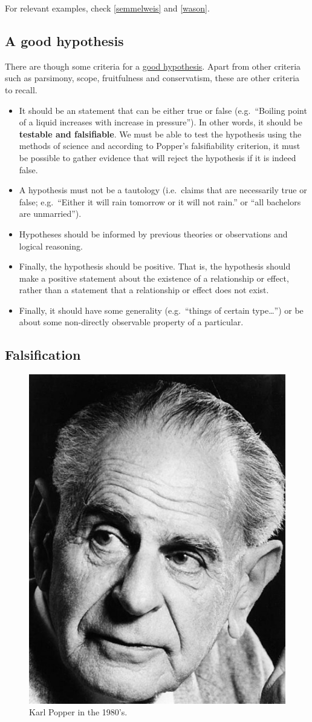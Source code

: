\documentclass[
]{book}
\begin{document}
For relevant examples, check \ref{semmelweis} and \ref{wason}.

\hypertarget{a-good-hypothesis}{%
\subsection{A good hypothesis}\label{a-good-hypothesis}}

There are though some criteria for a \href{https://opentext.wsu.edu/carriecuttler/chapter/developing-a-hypothesis/}{good hypothesis}. Apart from other criteria such as parsimony, scope, fruitfulness and conservatism, these are other criteria to recall.

\begin{itemize}
\item
  It should be an statement that can be either true or false (e.g.~``Boiling point of a liquid increases with increase in pressure''). In other words, it should be \textbf{testable and falsifiable}. We must be able to test the hypothesis using the methods of science and according to Popper's falsifiability criterion, it must be possible to gather evidence that will reject the hypothesis if it is indeed false.
\item
  A hypothesis must not be a tautology (i.e.~claims that are necessarily true or false; e.g.~``Either it will rain tomorrow or it will not rain.'' or ``all bachelors are unmarried'').
\item
  Hypotheses should be informed by previous theories or observations and logical reasoning.
\item
  Finally, the hypothesis should be positive. That is, the hypothesis should make a positive statement about the existence of a relationship or effect, rather than a statement that a relationship or effect does not exist.
\item
  Finally, it should have some generality (e.g.~``things of certain type\ldots{}'') or be about some non-directly observable property of a particular.
\end{itemize}

\hypertarget{falsification}{%
\subsection{Falsification}\label{falsification}}

\begin{figure}  
 \begin{center}
    \includegraphics[width=.22\textwidth]{Figures/Karl_Popper.jpg}  
  \captionsetup{labelformat=empty}
  \caption{Karl Popper in the 1980's.} 
\end{center}
\end{figure}
\addtocounter{figure}{-1}
\end{document}
